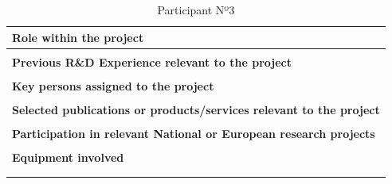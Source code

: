 \begin{longtable}[H]{|p{0.7cm}|p{4cm}|p{7cm}|p{1.3cm}|}
	\multicolumn{4}{|p{13cm}|}{\textbf{Role within the project}}   \\ \hline
	
	\multicolumn{4}{|p{13cm}|}{}  \\ \hline
	
	\multicolumn{4}{|p{13cm}|}{\textbf{Previous R\&D Experience relevant to the project}}  \\ \hline
	
	\multicolumn{4}{|p{13cm}|}{}  \\ \hline
	
	\multicolumn{4}{|p{13cm}|}{\textbf{Key persons assigned to the project}}   \\ \hline
	
	\multicolumn{4}{|p{13cm}|}{}  \\ \hline
	
	\multicolumn{4}{|p{13cm}|}{\textbf{Selected publications or products/services relevant to the project}}  \\ \hline
	
	\multicolumn{4}{|p{13cm}|}{}  \\ \hline
	
	\multicolumn{4}{|p{13cm}|}{\textbf{Participation in relevant National or European research projects}}  \\ \hline
	
	\multicolumn{4}{|p{13cm}|}{}  \\ \hline
	
	\multicolumn{4}{|p{13cm}|}{\textbf{Equipment involved}}  \\ \hline
	
	\multicolumn{4}{|p{13cm}|}{}  \\ \hline
	\caption{Participant Nº3}
\end{longtable}

